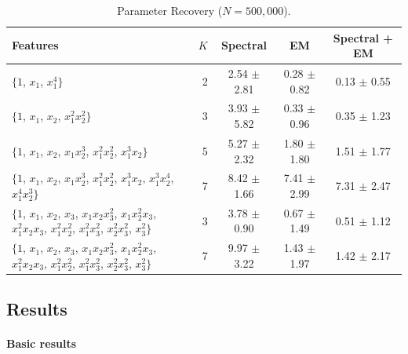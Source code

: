 \begin{table}[t]
\caption{Parameter Recovery ($N = 500,000$).}
\label{tbl:parameter-recovery}
\vskip 0.15in
\begin{center}
\begin{small}
\begin{sc}

  \begin{tabular}{ >{\centering}p{5cm}<{\centering} r c c c }
\hline
\abovespace\belowspace
Features  & $K$ & Spectral & EM & Spectral + EM \\
\hline
\abovespace
$\{1$, $ x_1$, $ x_1^4\}$ 
  & 2 & 2.54 $\pm$ 2.81 & 0.28 $\pm$ 0.82 & 0.13 $\pm$ 0.55 \\
$\{1$, $ x_1$, $ x_2$, $ x_1^2 x_2^2\}$ 
  & 3 & 3.93 $\pm$ 5.82 & 0.33 $\pm$ 0.96 & 0.35 $\pm$ 1.23 \\
$\{1$, $ x_1$, $ x_2$, $ x_1 x_2^3$, $ x_1^2 x_2^2$, $ x_1^3 x_2 \}$ 
  & 5 & 5.27 $\pm$ 2.32 & 1.80 $\pm$ 1.80 & 1.51 $\pm$ 1.77 \\
$\{1$, $ x_1$, $ x_2$, $ x_1 x_2^3$, $ x_1^2 x_2^2$, $ x_1^3 x_2$, $ x_1^3 x_2^4$, $ x_1^4 x_2^3 \}$ 
  & 7 & 8.42 $\pm$ 1.66 & 7.41 $\pm$ 2.99 & 7.31 $\pm$ 2.47 \\
$\{1$, $ x_1$, $ x_2$, $ x_3$, $ x_1 x_2 x_3^2$, $ x_1 x_2^2 x_3$, $ x_1^2 x_2 x_3$, $ x_1^2 x_2^2$, $ x_1^2 x_3^2$, $ x_2^2 x_3^2$, $ x_3^2\}$
  & 3 & 3.78 $\pm$ 0.90 & 0.67 $\pm$ 1.49 & 0.51 $\pm$ 1.12 \\
$\{1$, $ x_1$, $ x_2$, $ x_3$, $ x_1 x_2 x_3^2$, $ x_1 x_2^2 x_3$, $ x_1^2 x_2 x_3$, $ x_1^2 x_2^2$, $ x_1^2 x_3^2$, $ x_2^2 x_3^2$, $ x_3^2\}$
  & 7 & 9.97 $\pm$ 3.22 & 1.43 $\pm$ 1.97 & 1.42 $\pm$ 2.17 \\
\hline
\end{tabular}
\end{sc}
\end{small}
\end{center}
\vskip -0.1in
\end{table}


\subsection{Results}

\paragraph{Basic results}

